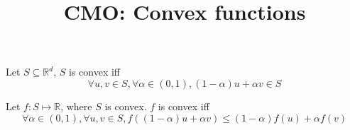 


\title{CMO: Convex functions}



\maketitle
\initMinimal{}

\begin{definition}
Let $S \subseteq \mathbb{R}^d$, $S$ is convex iff
\[ \forall u, v \in S, \forall \alpha \in (0, 1), (1-\alpha)u + \alpha v \in S \]
\end{definition}

\begin{definition}
Let $f: S \mapsto \mathbb{R}$, where $S$ is convex. $f$ is convex iff
\[ \forall \alpha \in (0, 1), \forall u, v \in S,
f((1-\alpha)u + \alpha v) \le (1-\alpha)f(u) + \alpha f(v) \]
\end{definition}

